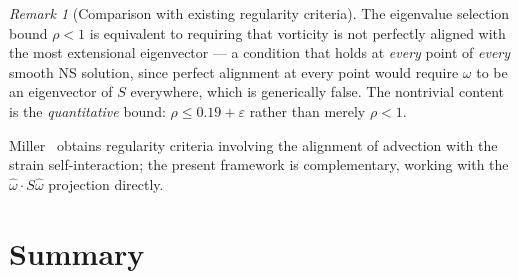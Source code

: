 \documentclass[11pt,a4paper]{article}
\theoremstyle{plain}
\theoremstyle{definition}
\theoremstyle{remark}
\newtheorem{remark}[theorem]{Remark}
\begin{document}
\begin{remark}[Comparison with existing regularity
criteria]
\label{rem:comparison}
The eigenvalue selection bound $\rho<1$ is
equivalent to requiring that vorticity is not
perfectly aligned with the most extensional
eigenvector --- a condition that holds at
\emph{every} point of \emph{every} smooth NS
solution, since perfect alignment at every point
would require $\omega$ to be an eigenvector of
$S$ everywhere, which is generically false.
The nontrivial content is the \emph{quantitative}
bound: $\rho\leq 0.19+\varepsilon$ rather than
merely $\rho<1$.

Miller~\cite{Miller24} obtains regularity criteria
involving the alignment of advection with the
strain self-interaction; the present framework
is complementary, working with the
$\hat\omega\cdot S\hat\omega$ projection directly.
\end{remark}


\section{Summary}\label{sec:summary}
\end{document}
